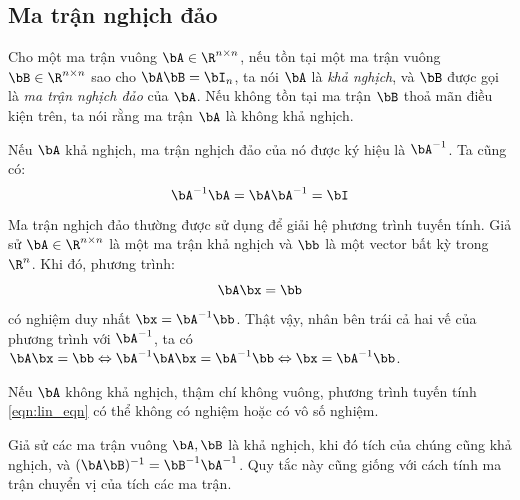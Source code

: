 \subsection{Ma trận nghịch đảo} %
\label{sub:inverse_matrix}

Cho một ma trận vuông $\bA \in \R^{n\times n }$, nếu tồn tại một ma trận vuông
$\bB \in \R^{n\times n}$ sao cho $\bA\bB = \bI_n$, ta nói $\bA$ là \textit{khả
nghịch}, và $\bB$ được gọi là \textit{ma trận nghịch đảo} của $\bA$. Nếu không
tồn tại ma trận $\bB$ thoả mãn điều kiện trên, ta nói rằng ma trận $\bA$ là
{không khả nghịch}.

Nếu $\bA$ khả nghịch, ma trận nghịch đảo của nó được ký hiệu là $\bA^{-1}$. Ta
cũng có:
\begin{equation}
    \bA^{-1}\bA = \bA\bA^{-1} = \bI
\end{equation}
Ma trận nghịch đảo thường được sử dụng để giải hệ phương trình tuyến tính. Giả
sử $\bA \in \R^{n\times n}$ là một ma trận khả nghịch và $\bb$ là một vector bất kỳ trong $\R^n$. Khi đó, phương trình:
\begin{equation}
\label{eqn:lin_eqn}
    \bA\bx = \bb
\end{equation}
có nghiệm duy nhất $\bx = \bA^{-1}\bb$. Thật vậy, nhân bên trái cả hai vế của
phương trình với $\bA^{-1}$, ta có $\bA\bx = \bb \Leftrightarrow  \bA^{-1}\bA\bx = \bA^{-1}\bb \Leftrightarrow \bx = \bA^{-1}\bb$.

Nếu $\bA$ không khả nghịch, thậm chí không vuông, phương trình tuyến tính
\eqref{eqn:lin_eqn} có thể không có nghiệm hoặc có vô số nghiệm.

Giả sử các ma trận vuông $\bA, \bB$ là khả nghịch, khi đó tích của chúng cũng
khả nghịch, và $(\bA\bB)^{-1} = \bB^{-1}\bA^{-1}$. Quy tắc này cũng giống
với cách tính ma trận chuyển vị của tích các ma trận.


